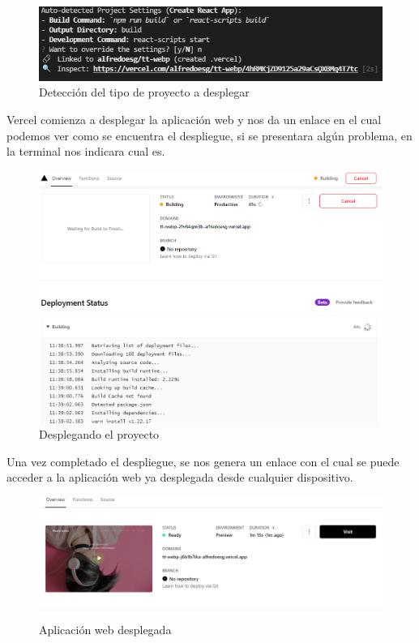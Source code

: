\documentclass[12pt, a4paper, titlepage]{report}
\begin{document}
\begin{figure}[H]
	\includegraphics[width=12cm]{./imagenes/Desarrollo/Despliegue/Deteccion.png}
	\centering 
	\caption{Detección del tipo de proyecto a desplegar}
\end{figure}
Vercel comienza a desplegar la aplicación web y nos da un enlace en el cual podemos ver como se encuentra el despliegue, si se presentara algún problema, en la terminal nos indicara cual es.
\begin{figure}[H]
	\includegraphics[width=12cm]{./imagenes/Desarrollo/Despliegue/Desplegando.png}
	\centering 
	\caption{Desplegando el proyecto}
\end{figure}
Una vez completado el despliegue, se nos genera un enlace con el cual se puede acceder a la aplicación web ya desplegada desde cualquier dispositivo.
\begin{figure}[H]
	\includegraphics[width=12cm]{./imagenes/Desarrollo/Despliegue/Desplegada.png}
	\centering 
	\caption{Aplicación web desplegada}
\end{figure}
\end{document}
